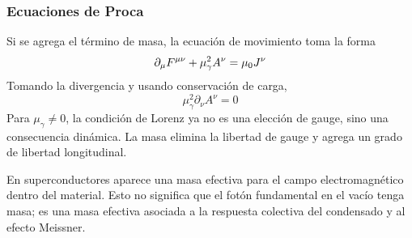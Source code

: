 \documentclass[]{article}
\numberwithin{equation}{section}
\begin{document}
\subsubsection{Ecuaciones de Proca}
Si se agrega el término de masa, la ecuación de movimiento toma la forma
\begin{equation}
	\partial_\mu F^{\mu\nu} + \mu_\gamma^2 A^\nu = \mu_{0} J^\nu
\end{equation}
Tomando la divergencia y usando conservación de carga,
\begin{equation}
	\mu_\gamma^2 \partial_\nu A^\nu = 0
\end{equation}
Para $\mu_\gamma \neq 0$, la condición de Lorenz ya no es una elección de gauge, sino una consecuencia dinámica. La masa elimina la libertad de gauge y agrega un grado de libertad longitudinal.

En superconductores aparece una masa efectiva para el campo electromagnético dentro del material. Esto no significa que el fotón fundamental en el vacío tenga masa; es una masa efectiva asociada a la respuesta colectiva del condensado y al efecto Meissner.
\end{document}
